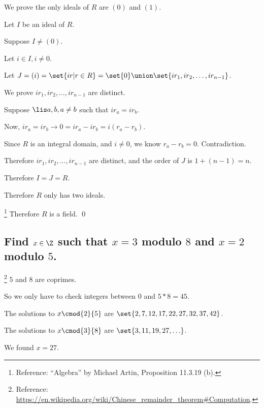         We prove the only ideals of $R$ are $(0)$ and $(1)$.

        Let $I$ be an ideal of $R$.

        Suppose $I \neq (0)$.

        Let $i \in I, i \neq 0$.

        Let $J = (i) = \set{ir | r \in R} = \set{0} \union \set{ir_1, ir_2, \hdots, ir_{n-1}}$.

        We prove $ir_1, ir_2, \hdots, ir_{n-1}$ are distinct.

        Suppose $\lis a,b, a \neq b$ such that $ir_a = ir_b$.

        Now, $ir_a = ir_b \to 0 = ir_a - ir_b = i(r_a - r_b)$.

        Since $R$ is an integral domain, and $i \neq 0$, we know
        $r_a - r_b = 0$. Contradiction.

        Therefore $ir_1, ir_2, \hdots, ir_{n-1}$ are distinct,
        and the order of $J$ is $1 + (n - 1) = n$.

        Therefore $I = J = R$.

        Therefore $R$ only has two ideals.

        \footnote{Reference: “Algebra” by Michael Artin, Proposition 11.3.19 (b).}
        Therefore $R$ is a field.
        \qed

    \subsection[(iii)]{Find $x \in \Z$ such that $x = 3$ modulo $8$ and $x = 2$ modulo $5$.}
        \footnote{Reference: \url{https://en.wikipedia.org/wiki/Chinese_remainder_theorem\#Computation}.}
        $5$ and $8$ are coprimes.

        So we only have to check integers between $0$ and $5 * 8 = 45$.

        The solutions to $x \cmod{2}{5}$ are $\set{2,7,12,17,22,27,32,37,42}$.

        The solutions to $x \cmod{3}{8}$ are $\set{3, 11, 19, 27, \hdots}$.

        We found $x = 27$.